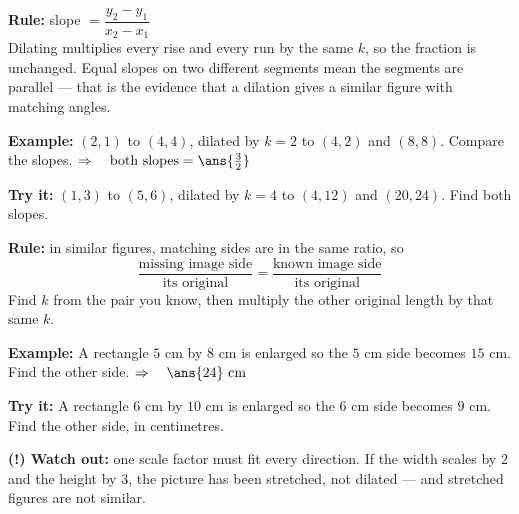 \documentclass[12pt]{article}
\begin{document}

\begin{formulabox}
\textbf{Rule:} \quad slope $= \dfrac{y_2 - y_1}{x_2 - x_1}$\\[3pt]
Dilating multiplies every rise and every run by the same $k$, so the fraction is unchanged. Equal
slopes on two different segments mean the segments are parallel --- that is the evidence that a
dilation gives a similar figure with matching angles.
\end{formulabox}

\begin{examplebox}
\textbf{Example:} \quad $(2, 1)$ to $(4, 4)$, dilated by $k = 2$ to $(4, 2)$ and $(8, 8)$.
Compare the slopes.
$\Rightarrow\quad \text{both slopes} = \ans{\tfrac{3}{2}}$
\end{examplebox}

\begin{tryitbox}
\textbf{Try it:} \quad $(1, 3)$ to $(5, 6)$, dilated by $k = 4$ to $(4, 12)$ and $(20, 24)$.
Find both slopes.\\[2pt]
\end{tryitbox}


\begin{formulabox}
\textbf{Rule:} in similar figures, matching sides are in the same ratio, so
\[ \frac{\text{missing image side}}{\text{its original}} = \frac{\text{known image side}}{\text{its original}} \]
Find $k$ from the pair you know, then multiply the other original length by that same $k$.
\end{formulabox}

\begin{examplebox}
\textbf{Example:} \quad A rectangle $5$ cm by $8$ cm is enlarged so the $5$ cm side becomes
$15$ cm. Find the other side.
$\Rightarrow\quad \ans{24} \text{ cm}$
\end{examplebox}

\begin{tryitbox}
\textbf{Try it:} \quad A rectangle $6$ cm by $10$ cm is enlarged so the $6$ cm side becomes
$9$ cm. Find the other side, in centimetres.\\[2pt]
\end{tryitbox}

\begin{watchoutbox}
\textbf{(!) Watch out:} one scale factor must fit every direction. If the width scales by $2$ and
the height by $3$, the picture has been stretched, not dilated --- and stretched figures are not
similar.
\end{watchoutbox}
\end{document}
